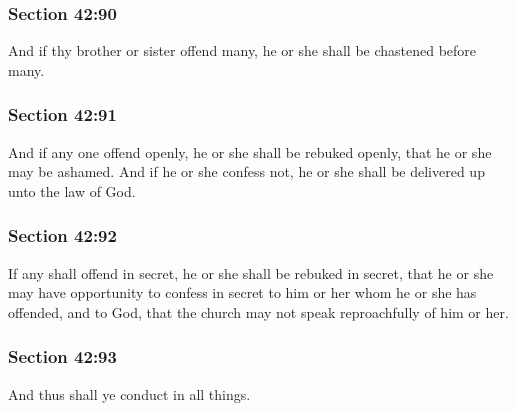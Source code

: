 	\subsubsection{Section 42:90} %
		\label{DC42-90}

		And if thy brother or sister offend many, he or she shall be chastened before many.


	\subsubsection{Section 42:91} %
		\label{DC42-91}

		And if any one offend openly, he or she shall be rebuked openly, that he or she may be ashamed.  And if he or she confess not, he or she shall be delivered up unto the law of God.


	\subsubsection{Section 42:92} %
		\label{DC42-92}

		If any shall offend in secret, he or she shall be rebuked in secret, that he or she may have opportunity to confess in secret to him or her whom he or she has offended, and to God, that the church may not speak reproachfully of him or her.


	\subsubsection{Section 42:93} %
		\label{DC42-93}

		And thus shall ye conduct in all things.

